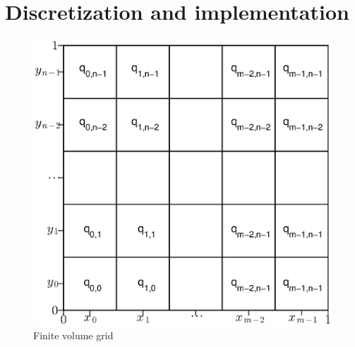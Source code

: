

\section{Discretization and implementation} 

\label{sec:discretization_and_implementation} 
\begin{figure}[htbp] 
	\centering 
	\includegraphics[width=.7\textwidth]{Figures/gridForNumericalSchemePlot.eps} \caption{Finite volume grid} \label{fig:Figures_gridForNumericalSchemePlot} 
\end{figure}

